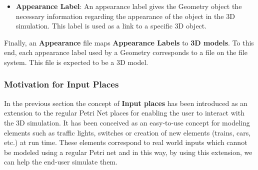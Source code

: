 \begin{itemize}
  \item \textbf{Appearance Label}: An appearance label gives the Geometry object the necessary information regarding the appearance of the object in the 3D simulation. This label is used as a link to a specific 3D object.
\end{itemize}

Finally, an \textbf{Appearance} file maps \textbf{Appearance Labels} to \textbf{3D models}.
To this end, each appearance label used by a Geometry corresponds to a file on the file system. This file is expected to be a 3D model.

\subsubsection{Motivation for Input Places}

In the previous section the concept of \textbf{Input places} has been introduced as an extension to the regular Petri Net places for enabling the user to interact with the 3D simulation. It has been conceived as an easy-to-use concept for modeling elements such as traffic lights, switches or creation of new elements (trains, cars, etc.) at run time. These elements correspond to real world inputs which cannot be modeled using a regular Petri net and in this way, by using this extension, we can help the end-user simulate them.

\newpage
